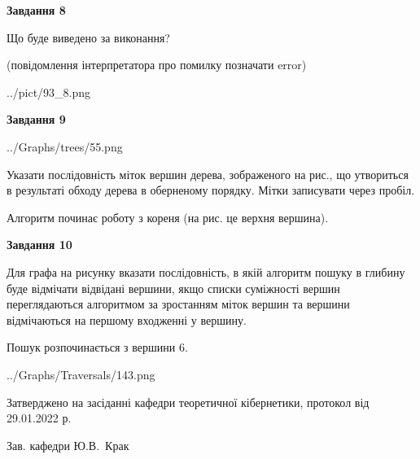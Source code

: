 \documentclass[12pt, ukrainian]{article}
\begin{document}
{\begin {large}
{\begin {center}\textbf{Завдання 8}\end {center}}\par
Що буде виведено за виконання?\par
 (повідомлення інтерпретатора про помилку позначати error)\par
\begin{center}
	{../pict/93_8.png}
\end{center}
\newpage

{\begin {center}\textbf{Завдання 9}\end {center}}\par

\begin{center}
	{../Graphs/trees/55.png}
\end{center}
Указати послідовність міток вершин дерева, зображеного на рис., що утвориться в результаті обходу дерева в оберненому порядку. Мітки записувати через пробіл.\par Алгоритм починає роботу з кореня (на рис. це верхня вершина).\par
\newpage

{\begin {center}\textbf{Завдання 10}\end {center}}\par
Для графа на рисунку вказати послідовність, в якій алгоритм пошуку в глибину буде відмічати відвідані вершини, якщо списки суміжності вершин переглядаються алгоритмом за зростанням міток вершин та вершини відмічаються на першому вход\-женні у вершину.\par
Пошук розпочинається з вершини 6.\par

\begin{center}
	{../Graphs/Traversals/143.png}
\end{center}\par
\newpage


\end {large}
}
{\smallskip \begin {small} Затверджено на засіданні кафедри теоретичної кібернетики, протокол  від   29.01.2022 р.\par\smallskip\smallskip
{\parbox {6.5 cm}{Зав. кафедри \dotfill Ю.В.~Крак}} \end{small}}
\end{document}
